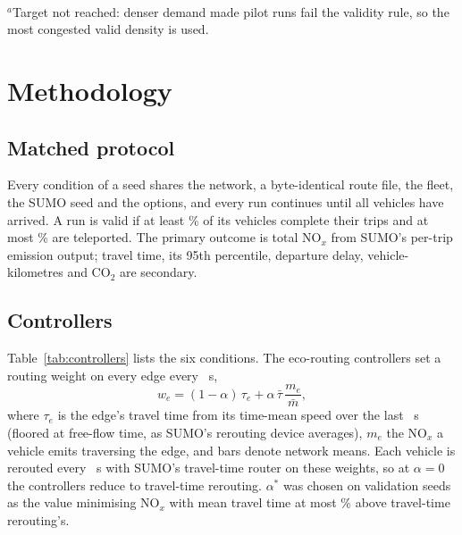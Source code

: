 \documentclass[conference]{IEEEtran}
\begin{document}
\begin{table}[t]
\centering\footnotesize
\caption{Calibrated Demand Levels (Density in veh/h/km of Road; RSR Achieved on Pilot Seeds)}
\label{tab:demand}
\\[2pt]
\parbox{\columnwidth}{\scriptsize $^{a}$Target not reached: denser demand made pilot runs fail the validity rule, so the
most congested valid density is used.}
\end{table}

\section{Methodology}\label{sec:methods}
\subsection{Matched protocol}
Every condition of a seed shares the network, a byte-identical route file, the fleet, the SUMO seed and the options,
and every run continues until all vehicles have arrived. A run is valid if at least \ValidCompletionPct\% of its
vehicles complete their trips and at most \ValidTeleportPct\% are teleported. The primary outcome is total NO$_x$ from
SUMO's per-trip emission output; travel time, its 95th percentile, departure delay, vehicle-kilometres and CO$_2$ are
secondary.

\subsection{Controllers}
Table~\ref{tab:controllers} lists the six conditions. The eco-routing controllers set a routing weight on every edge
every \ReroutePeriodS~s,
\begin{equation}
w_e = (1-\alpha)\,\tau_e + \alpha\,\bar\tau\,\frac{m_e}{\bar m},
\label{eq:weight}
\end{equation}
where $\tau_e$ is the edge's travel time from its time-mean speed over the last \TauAvgS~s (floored at free-flow time,
as SUMO's rerouting device averages), $m_e$ the NO$_x$ a vehicle emits traversing the edge, and bars denote network
means. Each vehicle is rerouted every \ReroutePeriodS~s with SUMO's travel-time router on these weights, so at
$\alpha = 0$ the controllers reduce to travel-time rerouting. $\alpha^*$ was chosen on validation seeds as the value
minimising NO$_x$ with mean travel time at most \AlphaTTBudgetPct\% above travel-time rerouting's.
\end{document}
